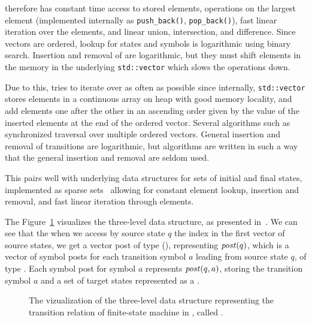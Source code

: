 \ordvector therefore has constant time access to stored elements, operations on the largest element (implemented internally as \texttt{push\_back()}, \texttt{pop\_back()}), fast linear iteration over the elements, and linear union, intersection, and difference.
Since vectors are ordered, lookup for states and symbols is logarithmic using binary search.
Insertion and removal of are logarithmic, but they must shift elements in the memory in the underlying \texttt{std::vector} which slows the operations down.

Due to this, \mata tries to iterate over \ordvector as often as possible since internally, \texttt{std::vector} stores elements in a continuous array on heap with good memory locality, and add elements one after the other in an ascending order given by the value of the inserted elements at the end of the ordered vector.
Several algorithms such as synchronized traversal over multiple ordered vectors.
General insertion and removal of transitions are logarithmic, but \mata algorithms are written in such a way that the general insertion and removal are seldom used.

This pairs well with underlying data structures for sets of initial and final states, implemented as sparse sets~\cite{sparseset93} allowing for constant element lookup, insertion and removal, and fast linear iteration through elements.

The Figure~\ref{fig:delta_struct} visualizes the three-level \deltastruct data structure, as presented in~\cite{tacas24_mata_10.1007/978-3-031-57249-4_7}. We can see that the when we access by source state $q$ the index in the first vector of source states, we get a vector post of type \statepost (\statepost[q]), representing $\mathit{post}(q)$, which is a vector of symbol posts for each transition symbol $a$ leading from source state $q$, of type \symbolpost.
Each symbol post for symbol $a$ represents $\mathit{post}(q, a)$, storing the transition symbol $a$ and a set of target states represented as a \ordvector.

\begin{figure}[ht]
  \centering
  \resizebox{0.6\textwidth}{!}{%
    
  }
\caption{
The vizualization of the three-level data structure representing the transition relation of finite-state machine in \mata, called \deltastruct.
}
\label{fig:delta_struct}
\end{figure}


